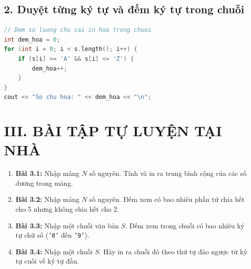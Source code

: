 \documentclass[11pt,a4paper]{article}
\begin{document}
\subsection*{\color{AsianBlue}2. Duyệt từng ký tự và đếm ký tự trong chuỗi}
\begin{lstlisting}[language=C++]
// Dem so luong chu cai in hoa trong chuoi
int dem_hoa = 0;
for (int i = 0; i < s.length(); i++) {
    if (s[i] >= 'A' && s[i] <= 'Z') {
        dem_hoa++;
    }
}
cout << "So chu hoa: " << dem_hoa << "\n";
\end{lstlisting}

\section*{\color{AsianDarkBlue}III. BÀI TẬP TỰ LUYỆN TẠI NHÀ}
\begin{enumerate}
    \setlength{\itemsep}{2pt}
    \small
    \item \textbf{Bài 3.1:} Nhập mảng $N$ số nguyên. Tính và in ra trung bình cộng của các số dương trong mảng.
    \item \textbf{Bài 3.2:} Nhập mảng $N$ số nguyên. Đếm xem có bao nhiêu phần tử chia hết cho 5 nhưng không chia hết cho 2.
    \item \textbf{Bài 3.3:} Nhập một chuỗi văn bản $S$. Đếm xem trong chuỗi có bao nhiêu ký tự chữ số (\texttt{'0'} đến \texttt{'9'}).
    \item \textbf{Bài 3.4:} Nhập một chuỗi $S$. Hãy in ra chuỗi đó theo thứ tự đảo ngược từ ký tự cuối về ký tự đầu.
\end{enumerate}
\end{document}
